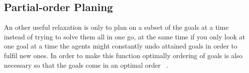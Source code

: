 \subsection{Partial-order Planing}
An other useful relaxation is only to plan on a subset of the goals at a time instead of trying to solve them all in one go, at the same time if you only look at one goal at a time the agents might constantly undo attained goals in order to fulfil new ones. In order to make this function optimally ordering of goals is also necessary so that the goals come in an optimal order ~\cite{Subgoals}.

